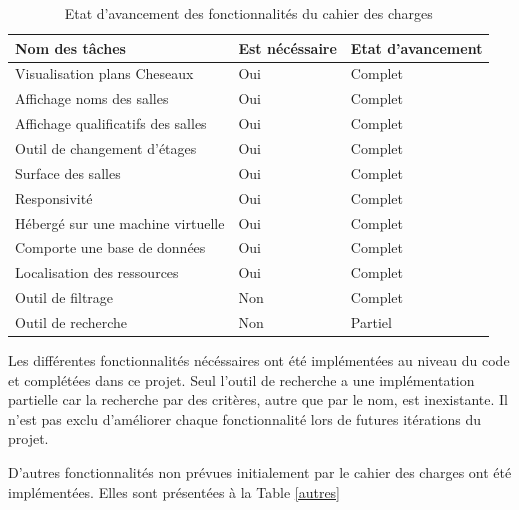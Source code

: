 \documentclass[
    iai, %
    il, %
]{heig-tb}
\begin{document}
\begin{table}[h]
    \begin{center}
        \begin{tabular}{l|l|l}
            Nom des tâches                     & Est nécéssaire & Etat d'avancement \\ \hline
            Visualisation plans Cheseaux       & Oui            & Complet           \\
            Affichage noms des salles          & Oui            & Complet           \\
            Affichage qualificatifs des salles & Oui            & Complet           \\
            Outil de changement d'étages       & Oui            & Complet           \\
            Surface des salles                 & Oui            & Complet           \\
            Responsivité                       & Oui            & Complet           \\
            Hébergé sur une machine virtuelle  & Oui            & Complet           \\
            Comporte une base de données       & Oui            & Complet           \\
            Localisation des ressources        & Oui            & Complet           \\
            Outil de filtrage                  & Non            & Complet           \\
            Outil de recherche                 & Non            & Partiel
        \end{tabular}
        \caption{Etat d'avancement des fonctionnalités du cahier des charges \label{charge}}
    \end{center}
\end{table}

Les différentes fonctionnalités nécéssaires ont été implémentées au niveau du code et complétées dans ce projet.
Seul l'outil de recherche a une implémentation partielle car la recherche par des critères, autre que par le nom, est inexistante.
Il n'est pas exclu d'améliorer chaque fonctionnalité lors de futures itérations du projet.

D'autres fonctionnalités non prévues initialement par le cahier des charges ont été implémentées.
Elles sont présentées à la Table \ref{autres}
\end{document}
